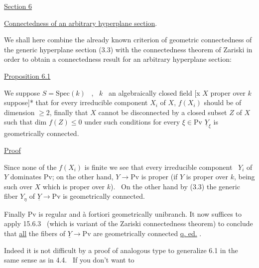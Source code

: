 
\uline{Section 6}

\uline{Connectedness of an arbitrary hyperplane section}.

We shall here combine the already known criterion of
geometric connectedness of the generic hyperplane section (3.3)
with the connectedness theorem of Zariski in order to obtain a
connectedness result for an arbitrary hyperplane section:

\uline{Proposition 6.1}

We suppose $S = \mathrm{Spec}(k)$ \ , \ $k$ \ an algebraically closed
field [x $X$ proper over $k$ suppose]* that for every irreducible
component $X_i$ of $X$, $f(X_i)$ should be of dimension $\geq 2$, finally that $X$
cannot be disconnected by a closed subset $Z$ of $X$ such that dim
$f(Z) \leq 0$ under such conditions for every $\xi \in \mathrm{Pv}$ \quad $\underline{Y}_{\xi}$ is
geometrically connected.

\uline{Proof}

Since none of the $f(X_i)$ is finite we see that every
irreducible component \ $Y_i$ of $Y$ dominates Pv; on the other hand,
$Y \longrightarrow \mathrm{Pv}$ is proper (if $Y$ is proper over $k$, being such over $X$ which
is proper over $k$). \ On the other hand by (3.3) the generic fiber $Y_{\eta}$
of $\underline{Y} \longrightarrow \mathrm{Pv}$ is geometrically connected.

Finally Pv is regular and à fortiori geometrically unibranch.
It now suffices to apply 15.6.3 \ (which is variant of the Zariski
connectedness theorem) to conclude that \uline{all} the fibers of $\underline{Y} \longrightarrow \mathrm{Pv}$
are geometrically connected \uline{q. ed.} .

Indeed it is not difficult by a proof of analogous type to
generalize 6.1 in the same sense as in 4.4. \ If you don't want to
